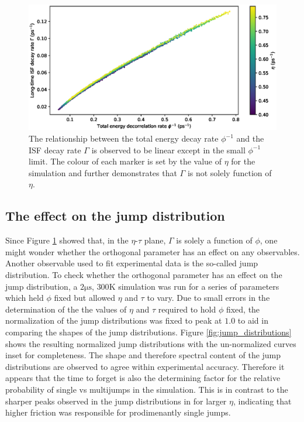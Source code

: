 \documentclass{article}
\newcommand{\us}{\si{\micro\second}}
\newcommand{\K}{\si{\kelvin}}
\begin{document}
\begin{figure}
	\includegraphics[width=1.0\textwidth]{gamma_and_ttf_scatter}
	\caption{The relationship between the total energy decay rate $\phi^{-1}$ and the ISF decay rate $\Gamma$ is observed to be linear except in the small $\phi^{-1}$ limit. The colour of each marker is set by the value of $\eta$ for the simulation and further demonstrates that $\Gamma$ is not solely function of $\eta$.}
	\label{fig:gamma_and_ttf_scatter}
\end{figure}


\subsection{The effect on the jump distribution}

Since Figure \ref{fig:gamma_and_ttf_scatter} showed that, in the $\eta$-$\tau$ plane, $\Gamma$ is solely a function of $\phi$, one might wonder whether the orthogonal parameter has an effect on any observables. Another observable used to fit experimental data is the so-called jump distribution. To check whether the orthogonal parameter has an effect on the jump distribution, a $2\us$, $300\K$ simulation was run for a series of parameters which held $\phi$ fixed but allowed $\eta$ and $\tau$ to vary. Due to small errors in the determination of the the values of $\eta$ and $\tau$ required to hold $\phi$ fixed, the normalization of the jump distributions was fixed to peak at $1.0$ to aid in comparing the shapes of the jump distributions. Figure \ref{fig:jump_distributions} shows the resulting normalized jump distributions with the un-normalized curves inset for completeness. The shape and therefore spectral content of the jump distributions are observed to agree within experimental accuracy. Therefore it appears that the time to forget is also the determining factor for the relative probability of single vs multijumps in the simulation. This is in contrast to the sharper peaks observed in the jump distributions in \cite{Gil} for larger $\eta$, indicating that higher friction was responsible for prodimenantly single jumps.
\end{document}
